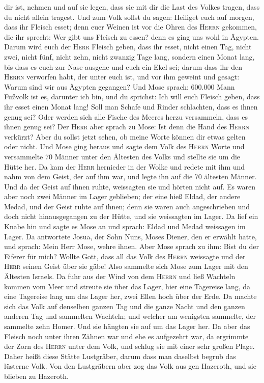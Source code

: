 dir ist, nehmen und auf sie legen, dass sie mit dir die Last des Volkes
tragen, dass du nicht allein tragest.  Und zum Volk
sollst du sagen: Heiliget euch auf morgen, dass ihr Fleisch esset; denn
euer Weinen ist vor die Ohren des \textsc{Herrn} gekommen, die ihr
sprecht: Wer gibt uns Fleisch zu essen? denn es ging uns wohl in
Ägypten. Darum wird euch der \textsc{Herr} Fleisch geben, dass ihr
esset,  nicht einen Tag, nicht zwei, nicht fünf, nicht
zehn, nicht zwanzig Tage lang,  sondern einen Monat lang,
bis dass es euch zur Nase ausgehe und euch ein Ekel sei; darum dass ihr
den \textsc{Herrn} verworfen habt, der unter euch ist, und vor ihm
geweint und gesagt: Warum sind wir aus Ägypten gegangen? 
Und Mose sprach: 600.000 Mann Fußvolk ist es, darunter ich bin, und du
sprichst: Ich will euch Fleisch geben, dass ihr esset einen Monat lang!
 Soll man Schafe und Rinder schlachten, dass es ihnen
genug sei? Oder werden sich alle Fische des Meeres herzu versammeln,
dass es ihnen genug sei?  Der \textsc{Herr} aber sprach
zu Mose: Ist denn die Hand des \textsc{Herrn} verkürzt? Aber du sollst
jetzt sehen, ob meine Worte können dir etwas gelten oder nicht.
 Und Mose ging heraus und sagte dem Volk des
\textsc{Herrn} Worte und versammelte 70 Männer unter den Ältesten des
Volks und stellte sie um die Hütte her.  Da kam der
\textsc{Herr} hernieder in der Wolke und redete mit ihm und nahm von dem
Geist, der auf ihm war, und legte ihn auf die 70 ältesten Männer. Und da
der Geist auf ihnen ruhte, weissagten sie und hörten nicht auf.
 Es waren aber noch zwei Männer im Lager geblieben; der
eine hieß Eldad, der andere Medad, und der Geist ruhte auf ihnen; denn
sie waren auch angeschrieben und doch nicht hinausgegangen zu der Hütte,
und sie weissagten im Lager.  Da lief ein Knabe hin und
sagte es Mose an und sprach: Eldad und Medad weissagen im Lager.
 Da antwortete Josua, der Sohn Nuns, Moses Diener, den er
erwählt hatte, und sprach: Mein Herr Mose, wehre ihnen. 
Aber Mose sprach zu ihm: Bist du der Eiferer für mich? Wollte Gott, dass
all das Volk des \textsc{Herrn} weissagte und der \textsc{Herr} seinen
Geist über sie gäbe!  Also sammelte sich Mose zum Lager
mit den Ältesten Israels.  Da fuhr aus der Wind von dem
\textsc{Herrn} und ließ Wachteln kommen vom Meer und streute sie über
das Lager, hier eine Tagereise lang, da eine Tagereise lang um das Lager
her, zwei Ellen hoch über der Erde.  Da machte sich das
Volk auf denselben ganzen Tag und die ganze Nacht und den ganzen anderen
Tag und sammelten Wachteln; und welcher am wenigsten sammelte, der
sammelte zehn Homer. Und sie hängten sie auf um das Lager her.
 Da aber das Fleisch noch unter ihren Zähnen war und ehe
es aufgezehrt war, da ergrimmte der Zorn des \textsc{Herrn} unter dem
Volk, und schlug sie mit einer sehr großen Plage.  Daher
heißt diese Stätte Lustgräber, darum dass man daselbst begrub das
lüsterne Volk.  Von den Lustgräbern aber zog das Volk aus
gen Hazeroth, und sie blieben zu Hazeroth.

